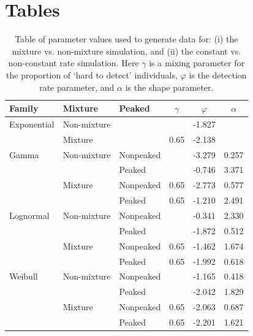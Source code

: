 \documentclass[useAMS,usenatbib,referee,12pt]{article}
\begin{document}
\section{Tables}
\begin{table}[!ht]
\centering
\begin{tabular}{lll|ccc}
  \hline
Family & Mixture & Peaked & $\gamma$ & $\varphi$ & $\alpha$ \\ 
  \hline
Exponential & Non-mixture & &  & -1.827 &  \\ 
  & Mixture & & 0.65 & -2.138 &  \\ 
  \hline
  Gamma & Non-mixture & Nonpeaked &  & -3.279 & 0.257 \\ 
  & & Peaked &  & -0.746 & 3.371 \\ 
  & Mixture & Nonpeaked & 0.65 & -2.773 & 0.577 \\ 
  & & Peaked & 0.65 & -1.210 & 2.491 \\ 
  \hline
  Lognormal & Non-mixture & Nonpeaked &  & -0.341 & 2.330 \\ 
  & & Peaked &  & -1.872 & 0.512 \\ 
  & Mixture & Nonpeaked & 0.65 & -1.462 & 1.674 \\ 
  & & Peaked & 0.65 & -1.992 & 0.618 \\ 
  \hline
  Weibull & Non-mixture & Nonpeaked &  & -1.165 & 0.418 \\ 
  & & Peaked &  & -2.042 & 1.829 \\ 
  & Mixture & Nonpeaked & 0.65 & -2.063 & 0.687 \\ 
  & & Peaked & 0.65 & -2.201 & 1.621 \\ 
   \hline
\end{tabular}
\caption{\label{simvals}Table of parameter values used to generate data for: (i) the mixture vs. non-mixture simulation, and (ii) the constant vs. non-constant rate simulation.  Here $\gamma$ is a mixing parameter for the proportion of `hard to detect' individuals, $\varphi$ is the detection rate parameter, and $\alpha$ is the shape parameter.}
\end{table}
\end{document}
